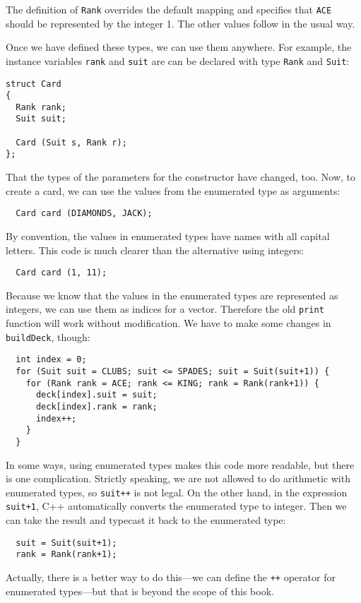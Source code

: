 The definition of {\tt Rank} overrides the default mapping and
specifies that {\tt ACE} should be represented by the integer 1.
The other values follow in the usual way.

Once we have defined these types, we can use them anywhere.  For
example, the instance variables {\tt rank} and {\tt suit} are
can be declared with type {\tt Rank} and {\tt Suit}:

\begin{lstlisting}
struct Card
{
  Rank rank;
  Suit suit;

  Card (Suit s, Rank r);
};
\end{lstlisting}
%
That the types of the parameters for the constructor
have changed, too.  Now, to create a card, we can use the values from
the enumerated type as arguments:

\begin{lstlisting}
  Card card (DIAMONDS, JACK);
\end{lstlisting}
%
By convention, the values in enumerated types have names with
all capital letters. 
This code is much clearer than the alternative using integers:

\begin{lstlisting}
  Card card (1, 11);
\end{lstlisting}
%
Because we know that the values in the enumerated types are
represented as integers, we can use them as indices for a vector.
Therefore the old {\tt print} function will work without
modification.  We have to make some changes in {\tt buildDeck},
though:

\begin{lstlisting}
  int index = 0;
  for (Suit suit = CLUBS; suit <= SPADES; suit = Suit(suit+1)) {
    for (Rank rank = ACE; rank <= KING; rank = Rank(rank+1)) {
      deck[index].suit = suit;
      deck[index].rank = rank;
      index++;
    }
  }
\end{lstlisting}
%
In some ways, using enumerated types makes this code more readable,
but there is one complication.  Strictly speaking, we are not
allowed to do arithmetic with enumerated types, so {\tt suit++}
is not legal.  On the other hand, in the expression {\tt suit+1},
C++ automatically converts the enumerated type to integer.  Then
we can take the result and typecast it back to the enumerated type:

\begin{lstlisting}
  suit = Suit(suit+1);
  rank = Rank(rank+1);
\end{lstlisting}
%
Actually, there is a better way to do this---we can define
the {\tt ++} operator for enumerated types---but that is beyond
the scope of this book.

